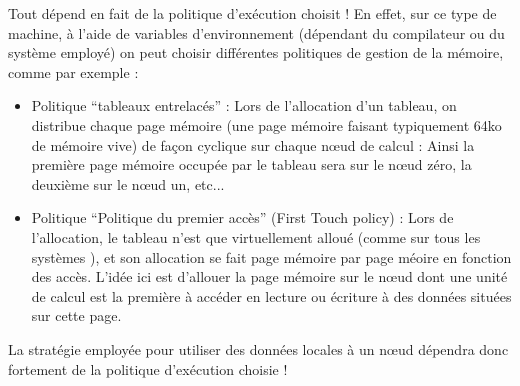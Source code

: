 \documentclass[fleqn,11pt]{article}
\begin{document}
Tout dépend en fait de la politique d'exécution choisit ! En effet, sur ce type de machine, à l'aide de variables d'environnement (dépendant du compilateur ou du système employé) on peut choisir différentes politiques de gestion de la mémoire, comme par exemple :
\begin{itemize}
  \item Politique ``tableaux entrelacés'' : Lors de l'allocation d'un tableau, on distribue chaque page mémoire (une page mémoire faisant typiquement 64ko de mémoire vive) de façon cyclique sur chaque n{\oe}ud de calcul :
  Ainsi la première page mémoire occupée par le tableau sera sur le n{\oe}ud zéro, la deuxième sur le n{\oe}ud un, etc...
  \item Politique ``Politique du premier accès'' (First Touch policy) :  Lors de l'allocation, le tableau n'est que virtuellement alloué (comme sur tous les systèmes ), et son allocation se fait page mémoire par page méoire en fonction des accès. L'idée ici est d'allouer la page mémoire sur le n{\oe}ud dont une unité de calcul est la première à accéder en lecture ou écriture à des données situées sur cette page.
\end{itemize}

La stratégie employée pour utiliser des données locales à un n{\oe}ud dépendra donc fortement de la politique d'exécution choisie !

%
%
%
%
\end{document}
